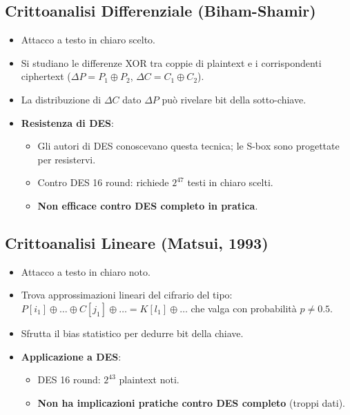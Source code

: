 \documentclass{article}
\begin{document}
\subsection{Crittoanalisi Differenziale (Biham-Shamir)}
\begin{itemize}
    \item Attacco a testo in chiaro scelto.
    \item Si studiano le differenze XOR tra coppie di plaintext e i corrispondenti ciphertext ($\Delta P = P_1 \oplus P_2$, $\Delta C = C_1 \oplus C_2$).
    \item La distribuzione di $\Delta C$ dato $\Delta P$ può rivelare bit della sotto-chiave.
    \item \textbf{Resistenza di DES}:
    \begin{itemize}
        \item Gli autori di DES conoscevano questa tecnica; le S-box sono progettate per resistervi.
        \item Contro DES 16 round: richiede $2^{47}$ testi in chiaro scelti.
        \item \textbf{Non efficace contro DES completo in pratica}.
    \end{itemize}
\end{itemize}

\subsection{Crittoanalisi Lineare (Matsui, 1993)}
\begin{itemize}
    \item Attacco a testo in chiaro noto.
    \item Trova approssimazioni lineari del cifrario del tipo:
    $P[i_1] \oplus \dots \oplus C[j_1] \oplus \dots = K[l_1] \oplus \dots$
    che valga con probabilità $p \neq 0.5$.
    \item Sfrutta il bias statistico per dedurre bit della chiave.
    \item \textbf{Applicazione a DES}:
    \begin{itemize}
        \item DES 16 round: $2^{43}$ plaintext noti.
        \item \textbf{Non ha implicazioni pratiche contro DES completo} (troppi dati).
    \end{itemize}
\end{itemize}
\end{document}
